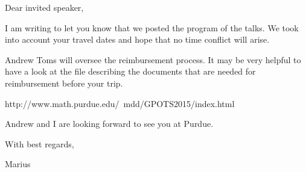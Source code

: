 
Dear invited speaker,

I am writing to let you know that we posted the program of the talks.
We took into account your travel dates and hope that no time conflict will arise.

Andrew Toms will oversee the reimbursement process. It may be very helpful to have a look at the file describing the documents that are needed for reimbursement before your trip.

http://www.math.purdue.edu/~mdd/GPOTS2015/index.html

Andrew and I are looking forward to see you at Purdue.

With best regards,

Marius 